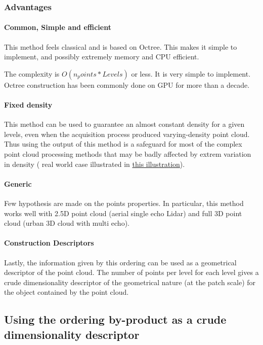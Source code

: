 		\subsubsection{Advantages}	
			\paragraph{Common, Simple and efficient}
				This method feels classical and is based on Octree. This makes it simple to implement, and possibly extremely memory and CPU efficient.

				The complexity is $O(n_points*Levels)$ or less. It is very simple to implement.				
				Octree construction has been commonly done on GPU for more than a decade.
				
			\paragraph{Fixed density}
				This method can be used to guarantee an almost constant density for a given levels, even when the acquisition process produced varying-density point cloud.
				Thus using the output of this method is a safeguard for most of the complex point cloud processing methods that may be badly affected by extrem variation in density ( real world case illustrated in \href{fig:density-variation}{this illustration}).
			\paragraph{Generic}
				Few hypothesis are made on the points properties. In particular, this method works well with 2.5D point cloud (aerial single echo Lidar) and full 3D point cloud (urban 3D cloud with multi echo).
			\paragraph{Construction Descriptors}
				Lastly, the information given by this ordering can be used as a  geometrical descriptor of the point cloud.
				The number of points per level for each level gives a crude dimensionality descriptor of the geometrical nature (at the patch scale) for the object contained by the point cloud.
				
	\subsection{Using the ordering by-product as a crude dimensionality descriptor}
	
	
		\label{method.dimdescriptor}
